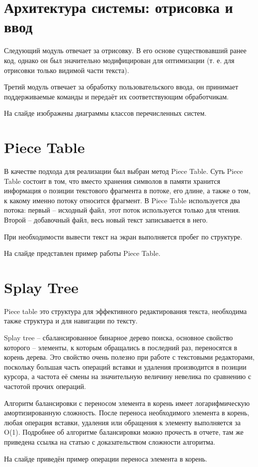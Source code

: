 \documentclass{article}
\begin{document}
    \section{Архитектура системы: отрисовка и ввод}
        \par Следующий модуль отвечает за отрисовку. В его основе существовавший ранее код, 
        однако он был значительно модифицирован для оптимизации (т. е. для отрисовки только 
        видимой части текста).
        \par Третий модуль отвечает за обработку пользовательского ввода, он принимает 
        поддерживаемые команды и передаёт их соответствующим обработчикам.
        \par На слайде изображены диаграммы классов перечисленных систем.
    \section{Piece Table}
        \par В качестве подхода для реализации был выбран метод Piece Table. Суть Piece Table 
        состоит в том, что вместо хранения символов в памяти хранится информация о позиции 
        текстового фрагмента в потоке, его длине, а также о том, к какому именно потоку 
        относится фрагмент. В Piece Table используется два потока: первый – исходный файл, этот 
        поток используется только для чтения. Второй – добавочный файл, весь новый текст 
        записывается в него.
        \par При необходимости вывести текст на экран выполняется пробег по структуре.
        \par На слайде представлен пример работы Piece Table.
    \section{Splay Tree}
        \par Piece table это структура для эффективного редактирования текста, необходима также 
        структура и для навигации по тексту.
        \par Splay tree – сбалансированное бинарное дерево поиска, основное свойство которого – 
        элементы, к которым обращались в последний раз, переносятся в корень дерева. Это 
        свойство очень полезно при работе с текстовыми редакторами, поскольку большая часть 
        операций вставки и удаления производится в позиции курсора, а частота её смены на 
        значительную величину невелика по сравнению с частотой прочих операций.
        \par Алгоритм балансировки с переносом элемента в корень имеет логарифмическую 
        амортизированную сложность. После переноса необходимого элемента в корень, любая 
        операция вставки, удаления или обращения к элементу выполняется за O(1). Подробнее об 
        алгоритме балансировки можно прочесть в отчете, там же приведена ссылка на статью с 
        доказательством сложности алгоритма.
        \par На слайде приведён пример операции переноса элемента в корень.
\end{document}

